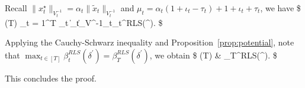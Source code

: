 Recall $\|x^{\star}_t\|_{V^{-1}_t} = \alpha_t \|\tilde{x}_t\|_{V^{-1}_t}$ and $\mu_t  =  \alpha_t(1+\iota_t -\tau_t)+1+\iota_t+\tau_t$, we have 
\$
\cR(T)  \leq \sum_{t = 1}^T   \mu_t \|_t\|_{V^{-1}_t}\beta_t^{RLS}(\delta^\prime).
\$ 

Applying the Cauchy-Schwarz inequality and Proposition~\ref{prop:potential}, note that $\max_{t\in[T]}  \beta_t^{RLS}(\delta^\prime) = \beta_T^{RLS}(\delta^\prime)$, we obtain 
\$
\cR(T) &\leq   {}  \leq {}    \beta_T^{RLS}(\delta^\prime).
\$


This concludes the proof.
\endproof

%
%
%
%
%
%
